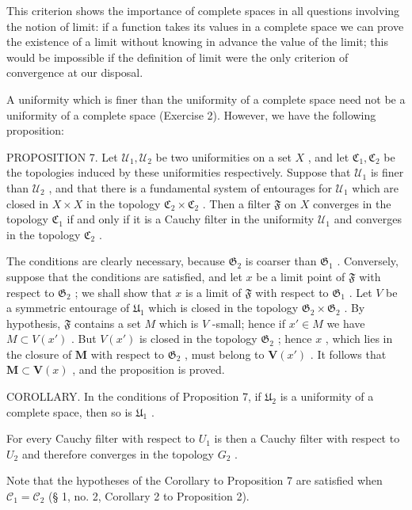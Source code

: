 This criterion shows the importance of complete spaces in all questions involving the notion of limit: if a function takes its values in a complete space we can prove the existence of a limit without knowing in advance the value of the limit; this would be impossible if the definition of limit were the only criterion of convergence at our disposal.

A uniformity which is finer than the uniformity of a complete space need not be a uniformity of a complete space (Exercise 2). However, we have the following proposition:

PROPOSITION 7. Let \(\mathcal{U}_1, \mathcal{U}_2\) be two uniformities on a set \(X\) , and let \(\mathfrak{C}_1, \mathfrak{C}_2\) be the topologies induced by these uniformities respectively. Suppose that \(\mathcal{U}_1\) is finer than \(\mathcal{U}_2\) , and that there is a fundamental system of entourages for \(\mathcal{U}_1\) which are closed in \(X \times X\) in the topology \(\mathfrak{C}_2 \times \mathfrak{C}_2\) . Then a filter \(\mathfrak{F}\) on \(X\) converges in the topology \(\mathfrak{C}_1\) if and only if it is a Cauchy filter in the uniformity \(\mathcal{U}_1\) and converges in the topology \(\mathfrak{C}_2\) .

The conditions are clearly necessary, because \(\mathfrak{G}_2\) is coarser than \(\mathfrak{G}_1\) . Conversely, suppose that the conditions are satisfied, and let \(x\) be a limit point of \(\mathfrak{F}\) with respect to \(\mathfrak{G}_2\) ; we shall show that \(x\) is a limit of \(\mathfrak{F}\) with respect to \(\mathfrak{G}_1\) . Let \(V\) be a symmetric entourage of \(\mathfrak{U}_1\) which is closed in the topology \(\mathfrak{G}_2 \times \mathfrak{G}_2\) . By hypothesis, \(\mathfrak{F}\) contains a set \(M\) which is \(V\) -small; hence if \(x' \in M\) we have \(M \subset V(x')\) . But \(V(x')\) is closed in the topology \(\mathfrak{G}_{2}\) ; hence \(x\) , which lies in the closure of \(\mathbf{M}\) with respect to \(\mathfrak{G}_{2}\) , must belong to \(\mathbf{V}(x')\) . It follows that \(\mathbf{M} \subset \mathbf{V}(x)\) , and the proposition is proved.

COROLLARY. In the conditions of Proposition 7, if \(\mathfrak{U}_2\) is a uniformity of a complete space, then so is \(\mathfrak{U}_1\) .

For every Cauchy filter with respect to \(U_{1}\) is then a Cauchy filter with respect to \(U_{2}\) and therefore converges in the topology \(G_{2}\) .

Note that the hypotheses of the Corollary to Proposition 7 are satisfied when \(\mathcal{C}_1 = \mathcal{C}_2\) (§ 1, no. 2, Corollary 2 to Proposition 2).

